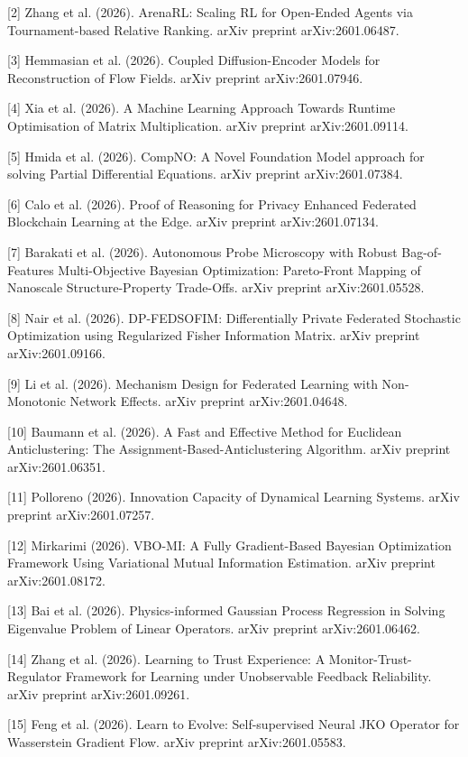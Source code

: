 [2] Zhang et al. (2026). ArenaRL: Scaling RL for Open-Ended Agents via Tournament-based Relative Ranking. arXiv preprint arXiv:2601.06487.

[3] Hemmasian et al. (2026). Coupled Diffusion-Encoder Models for Reconstruction of Flow Fields. arXiv preprint arXiv:2601.07946.

[4] Xia et al. (2026). A Machine Learning Approach Towards Runtime Optimisation of Matrix Multiplication. arXiv preprint arXiv:2601.09114.

[5] Hmida et al. (2026). CompNO: A Novel Foundation Model approach for solving Partial Differential Equations. arXiv preprint arXiv:2601.07384.

[6] Calo et al. (2026). Proof of Reasoning for Privacy Enhanced Federated Blockchain Learning at the Edge. arXiv preprint arXiv:2601.07134.

[7] Barakati et al. (2026). Autonomous Probe Microscopy with Robust Bag-of-Features Multi-Objective Bayesian Optimization: Pareto-Front Mapping of Nanoscale Structure-Property Trade-Offs. arXiv preprint arXiv:2601.05528.

[8] Nair et al. (2026). DP-FEDSOFIM: Differentially Private Federated Stochastic Optimization using Regularized Fisher Information Matrix. arXiv preprint arXiv:2601.09166.

[9] Li et al. (2026). Mechanism Design for Federated Learning with Non-Monotonic Network Effects. arXiv preprint arXiv:2601.04648.

[10] Baumann et al. (2026). A Fast and Effective Method for Euclidean Anticlustering: The Assignment-Based-Anticlustering Algorithm. arXiv preprint arXiv:2601.06351.

[11] Polloreno (2026). Innovation Capacity of Dynamical Learning Systems. arXiv preprint arXiv:2601.07257.

[12] Mirkarimi (2026). VBO-MI: A Fully Gradient-Based Bayesian Optimization Framework Using Variational Mutual Information Estimation. arXiv preprint arXiv:2601.08172.

[13] Bai et al. (2026). Physics-informed Gaussian Process Regression in Solving Eigenvalue Problem of Linear Operators. arXiv preprint arXiv:2601.06462.

[14] Zhang et al. (2026). Learning to Trust Experience: A Monitor-Trust-Regulator Framework for Learning under Unobservable Feedback Reliability. arXiv preprint arXiv:2601.09261.

[15] Feng et al. (2026). Learn to Evolve: Self-supervised Neural JKO Operator for Wasserstein Gradient Flow. arXiv preprint arXiv:2601.05583.

